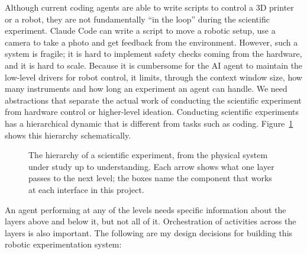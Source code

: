 \documentclass[11pt,letterpaper]{article}
\begin{document}
Although current coding agents are able to write scripts to control a 3D printer or a robot, they are not
fundamentally ``in the loop'' during the scientific experiment. Claude Code can write a script to
move a robotic setup, use a camera to take a photo and get feedback from the environment. However,
such a system is fragile; it is hard to implement safety checks coming from the hardware, and it
is hard to scale. Because it is cumbersome for the AI agent to maintain the low-level drivers for robot
control, it limits, through the context window size, how many instruments and how long an experiment
an agent can handle. We need abstractions that separate the actual work of conducting the
scientific experiment from hardware control or higher-level ideation. Conducting scientific experiments has a hierarchical dynamic that is different from tasks such as coding. Figure~\ref{fig:hierarchy} shows this
hierarchy schematically.

\begin{figure}[htb]
  \centering
  
  \caption{The hierarchy of a scientific experiment, from the physical system under study up to
    understanding. Each arrow shows what one layer passes to the next level; the boxes name the
    component that works at each interface in this project.}
  \label{fig:hierarchy}
\end{figure}

An agent performing at any of the levels needs specific information about the layers above and
below it, but not all of it. Orchestration of activities across the layers is also important.
The following are my design decisions for building this robotic experimentation system:
\end{document}

